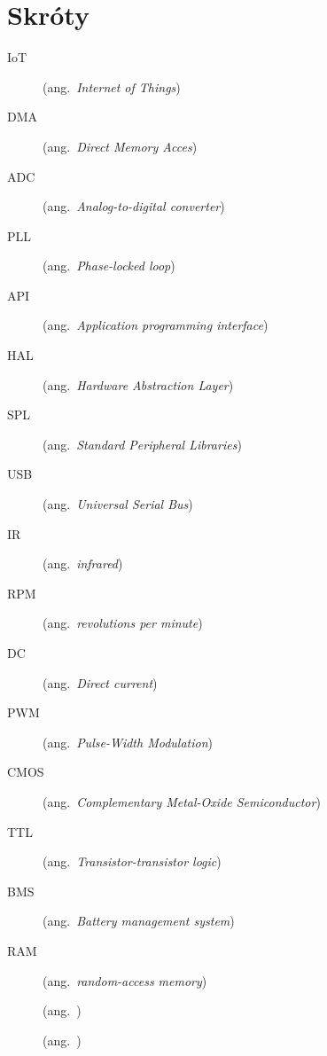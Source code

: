 \chapter*{Skróty}\mbox{}
\label{sec:skroty}
\noindent
\begin{description}
	\item [IoT] (ang.\ \emph{Internet of Things})
	\item [DMA] (ang.\ \emph{Direct Memory Acces})
	\item [ADC] (ang.\ \emph{Analog-to-digital converter})
	\item [PLL] (ang.\ \emph{Phase-locked loop})
	\item [API] (ang.\ \emph{Application programming interface})
	\item [HAL] (ang.\ \emph{Hardware Abstraction Layer})
	\item [SPL] (ang.\ \emph{Standard Peripheral Libraries})
	\item [USB] (ang.\ \emph{Universal Serial Bus})
	\item [IR] (ang.\ \emph{infrared})
	\item [RPM] (ang.\ \emph{revolutions per minute})
	\item [DC] (ang.\ \emph{Direct current})
	\item [PWM] (ang.\ \emph{Pulse-Width Modulation})
	\item [CMOS] (ang.\ \emph{Complementary Metal-Oxide Semiconductor})
	\item [TTL] (ang.\ \emph{Transistor-transistor logic})
	\item [BMS] (ang.\ \emph{Battery management system})
	\item [RAM] (ang.\ \emph{random-access memory}) 
	\item [] (ang.\ \emph{}) 
	\item [] (ang.\ \emph{}) 
\end{description}
